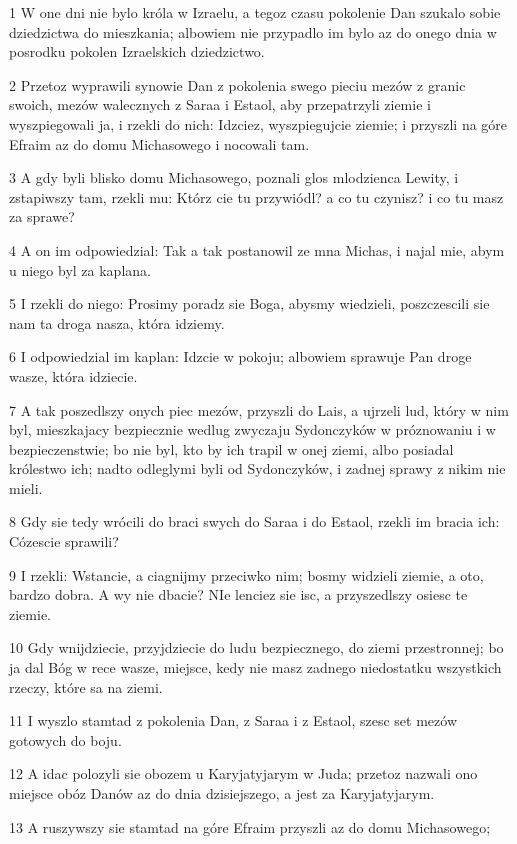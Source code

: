 \par 1 W one dni nie bylo króla w Izraelu, a tegoz czasu pokolenie Dan szukalo sobie dziedzictwa do mieszkania; albowiem nie przypadlo im bylo az do onego dnia w posrodku pokolen Izraelskich dziedzictwo.
\par 2 Przetoz wyprawili synowie Dan z pokolenia swego pieciu mezów z granic swoich, mezów walecznych z Saraa i Estaol, aby przepatrzyli ziemie i wyszpiegowali ja, i rzekli do nich: Idzciez, wyszpiegujcie ziemie; i przyszli na góre Efraim az do domu Michasowego i nocowali tam.
\par 3 A gdy byli blisko domu Michasowego, poznali glos mlodzienca Lewity, i zstapiwszy tam, rzekli mu: Którz cie tu przywiódl? a co tu czynisz? i co tu masz za sprawe?
\par 4 A on im odpowiedzial: Tak a tak postanowil ze mna Michas, i najal mie, abym u niego byl za kaplana.
\par 5 I rzekli do niego: Prosimy poradz sie Boga, abysmy wiedzieli, poszczescili sie nam ta droga nasza, która idziemy.
\par 6 I odpowiedzial im kaplan: Idzcie w pokoju; albowiem sprawuje Pan droge wasze, która idziecie.
\par 7 A tak poszedlszy onych piec mezów, przyszli do Lais, a ujrzeli lud, który w nim byl, mieszkajacy bezpiecznie wedlug zwyczaju Sydonczyków w próznowaniu i w bezpieczenstwie; bo nie byl, kto by ich trapil w onej ziemi, albo posiadal królestwo ich; nadto odleglymi byli od Sydonczyków, i zadnej sprawy z nikim nie mieli.
\par 8 Gdy sie tedy wrócili do braci swych do Saraa i do Estaol, rzekli im bracia ich: Cózescie sprawili?
\par 9 I rzekli: Wstancie, a ciagnijmy przeciwko nim; bosmy widzieli ziemie, a oto, bardzo dobra. A wy nie dbacie? NIe lenciez sie isc, a przyszedlszy osiesc te ziemie.
\par 10 Gdy wnijdziecie, przyjdziecie do ludu bezpiecznego, do ziemi przestronnej; bo ja dal Bóg w rece wasze, miejsce, kedy nie masz zadnego niedostatku wszystkich rzeczy, które sa na ziemi.
\par 11 I wyszlo stamtad z pokolenia Dan, z Saraa i z Estaol, szesc set mezów gotowych do boju.
\par 12 A idac polozyli sie obozem u Karyjatyjarym w Juda; przetoz nazwali ono miejsce obóz Danów az do dnia dzisiejszego, a jest za Karyjatyjarym.
\par 13 A ruszywszy sie stamtad na góre Efraim przyszli az do domu Michasowego;
